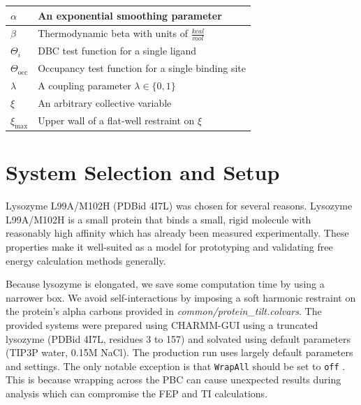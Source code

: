 \documentclass[9pt,tutorial]{Styling/livecoms}
\newcommand{\filepath}[1]{\textit{#1}}
\newcommand{\textInput}[1]{
  \texttt{#1}
}
\begin{document}
\begin{table}[H]
\begin{tabular}{  p{.26\linewidth} | p{.7\linewidth}  }
        \hline
        $\alpha$ & An exponential smoothing parameter\\
        \hline
        $\beta$ & Thermodynamic beta with units of $\frac{kcal}{mol}$\\
        \hline
        $\Theta_i$ & DBC test function for a single ligand\\
        \hline
        $\Theta_\mathrm{occ}$ & Occupancy test function for a single binding site\\
        \hline
        $\lambda$ & A coupling parameter $\lambda\in\{0,1\}$\\
        \hline
        $\xi$ & An arbitrary collective variable\\
        \hline
        $\xi_\mathrm{max}$ & Upper wall of a flat-well restraint on $\xi$\\
    \end{tabular}
\end{table}

\setcounter{section}{0}
\renewcommand\thesection{Appendix~\Alph{section}}
\renewcommand\thesubsection{\thesection.\arabic{subsection}}



\section{System Selection and Setup}
\label{app:motivation}
Lysozyme L99A/M102H (PDBid 4I7L) was chosen for several reasons. Lysozyme L99A/M102H is a small protein that binds a small, rigid molecule with reasonably high affinity which has already been measured experimentally. These properties make it well-suited as a model for prototyping and validating free energy calculation methods generally. 

Because lysozyme is elongated, we save some computation time by using a narrower box. We avoid self-interactions by imposing a soft harmonic restraint on the protein's alpha carbons provided in \filepath{common/protein\_tilt.colvars}. \label{app:equilibration}
The provided systems were prepared using CHARMM-GUI\cite{Jo2008, Lee2016} using a truncated lysozyme (PDBid 4I7L, residues 3 to 157) and solvated using default parameters (TIP3P water, 0.15M NaCl). 
The production run uses largely default parameters and settings. The only notable exception is that \textInput{WrapAll} should be set to \textInput{off}. 
This is because wrapping across the PBC can cause unexpected results during analysis which can compromise the FEP and TI calculations.
\end{document}
